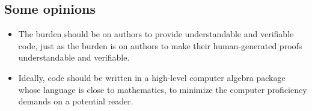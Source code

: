 \subsection {Some opinions}

\begin{itemize}
\item
The burden should be on authors 
to provide understandable and verifiable code,
just as the burden is on authors to make their human-generated proofs 
understandable and verifiable.
\item 
Ideally, code should be written in a high-level computer algebra package
whose language is close to mathematics,
to minimize the computer proficiency demands on a potential reader.
\end{itemize}
